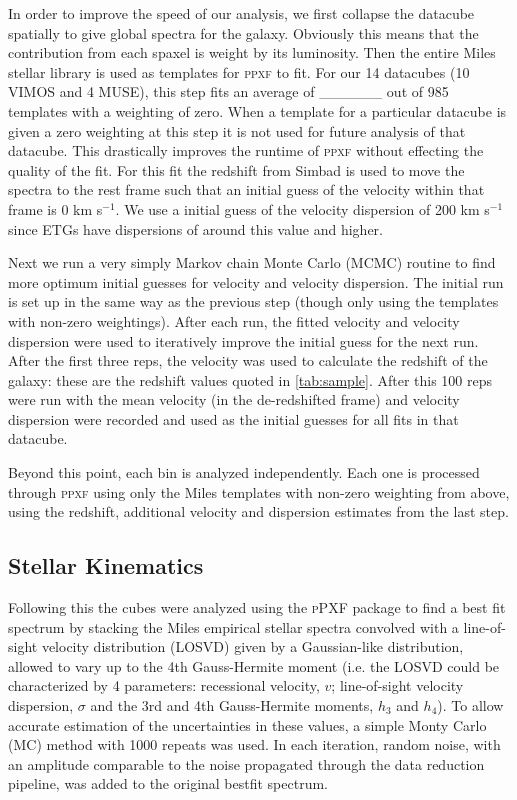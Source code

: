 		In order to improve the speed of our analysis, we first collapse the datacube spatially to give global spectra for the galaxy. Obviously this means that the contribution from each spaxel is weight by its luminosity. Then the entire Miles stellar library \citep{} is used as templates for \textsc{ppxf} to fit. For our 14 datacubes (10 VIMOS and 4 MUSE), this step fits an average of \_\_\_\_\_\_ out of 985 templates with a weighting of zero. When a template for a particular datacube is given a zero weighting at this step it is not used for future analysis of that datacube. This drastically improves the runtime of \textsc{ppxf} without effecting the quality of the fit. For this fit the redshift from Simbad is used to move the spectra to the rest frame such that an initial guess of the velocity within that frame is 0 km s$^{-1}$. We use a initial guess of the velocity dispersion of 200 km s$^{-1}$ since ETGs have dispersions of around this value and higher. 

		Next we run a very simply Markov chain Monte Carlo (MCMC) routine to find more optimum initial guesses for velocity and velocity dispersion. The initial run is set up in the same way as the previous step (though only using the templates with non-zero weightings). After each run, the fitted velocity and velocity dispersion were used to iteratively improve the initial guess for the next run. After the first three reps, the velocity was used to calculate the redshift of the galaxy: these are the redshift values quoted in \ref{tab:sample}. After this 100 reps were run with the mean velocity (in the de-redshifted frame) and velocity dispersion were recorded and used as the initial guesses for all fits in that datacube. 

		Beyond this point, each bin is analyzed independently. Each one is processed through \textsc{ppxf} using only the Miles templates with non-zero weighting from above, using the redshift, additional velocity and dispersion estimates from the last step.


	\subsection{Stellar Kinematics}
		Following this the cubes were analyzed using the \textsc{pPXF} package \citep{Cappellari2004} to find a best fit spectrum by stacking the Miles empirical stellar spectra \citep{Sanchez-Blazquez2006} convolved with a line-of-sight velocity distribution (LOSVD) given by a Gaussian-like distribution, allowed to vary up to the 4th Gauss-Hermite moment (i.e. the LOSVD could be characterized by 4 parameters: recessional velocity, $v$; line-of-sight velocity dispersion, $\sigma$ and the 3rd and 4th Gauss-Hermite moments, $h_3$ and $h_4$). To allow accurate estimation of the uncertainties in these values, a simple Monty Carlo (MC) method with 1000 repeats was used. In each iteration, random noise, with an amplitude comparable to the noise propagated through the data reduction pipeline, was added to the original bestfit spectrum.



